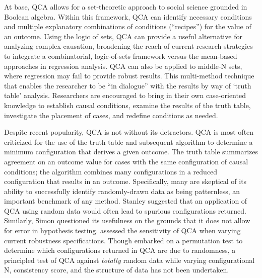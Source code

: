 \documentclass[12pt]{article}
\begin{document}
{{{{%

At base, QCA allows for a set-theoretic approach to social science grounded in Boolean algebra. Within this framework, QCA can identify necessary conditions and multiple explanatory combinations of conditions (``recipes'') for the value of an outcome. Using the logic of sets, QCA can provide a useful alternative for analyzing complex causation, broadening the reach of current research strategies to integrate a combinatorial, logic-of-sets framework versus the mean-based approaches in regression analysis. QCA can also be applied to middle-N sets, where regression may fail to provide robust results. This multi-method technique that enables the researcher to be ``in dialogue'' with the results by way of `truth table' analysis. Researchers are encouraged to bring in their own case-oriented knowledge to establish causal conditions, examine the results of the truth table, investigate the placement of cases, and redefine conditions as needed. %


Despite recent popularity, QCA is not without its detractors. QCA is most often criticized for the use of the truth table and subsequent algorithm to determine a minimum configuration that derives a given outcome. The truth table summarizes agreement on an outcome value for cases with the same configuration of causal conditions; the algorithm combines many configurations in a reduced configuration that results in an outcome. Specifically, many are skeptical of its ability to successfully identify randomly-drawn data as being patternless, an important benchmark of any method. Stanley \citet{lieberson_2004} suggested that an application of QCA using random data would often lead to spurious configurations returned. Similarly, Simon \citet{hug_2013} questioned its usefulness on the grounds that it does not allow for error in hypothesis testing. \citet{skaaning_2011} assessed the sensitivity of QCA when varying current robustness specifications. Though \citet{braumoeller_2015} embarked on a permutation test to determine which configurations returned in QCA are due to randomness, a principled test of QCA against {\it{totally}} random data while varying configurational N, consistency score, and the structure of data has not been undertaken.

}}}}
\end{document}
